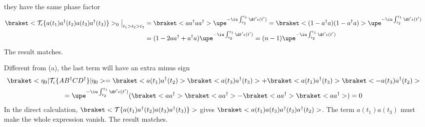 \begin{solution}
\begin{enumext}
    they have the same phase factor
    \begin{align*}
      \braket<
        \mathcal T_\epsilon\{a(t_1) a^\dagger(t_2) a(t_3) a^\dagger(t_3)\}>_0
      \big|_{t_1>t_2>t_3}
  & = \braket<a a^\dagger a a^\dagger>
      \upe^{-\iu\int_{t_2}^{t_1} \d t'\epsilon(t')}
    = \braket<(1 - a^\dagger a)(1 - a^\dagger a)>
      \upe^{-\iu\int_{t_2}^{t_1} \d t'\epsilon(t')}\\
  & = (1 - 2aa^\dagger + a^\dagger a)
      \upe^{-\iu\int_{t_2}^{t_1} \d t'\epsilon(t')}
    = (n - 1) \upe^{-\iu\int_{t_2}^{t_1} \d t'\epsilon(t')}
    \end{align*}
    The result matches.
    \item Different from (a), the last term will have an extra minus sign
    \begin{multline*}
      \braket<\eta_0|\mathcal T_\epsilon\{AB^\dagger CD^\dagger\}|\eta_0>
    = \braket<a(t_1) a^\dagger(t_2)>
      \braket<a(t_3) a^\dagger(t_3)>
    + \braket<a(t_1) a^\dagger(t_3)>
      \braket<-a(t_3) a^\dagger(t_2)>\\
    = \upe^{-\iu\int_{t_2}^{t_1} \d t'\epsilon(t')}(
      \braket<aa^\dagger> \braket<aa^\dagger>
    - \braket<aa^\dagger> \braket<aa^\dagger>) = 0
    \end{multline*}
    In the direct calculation,
    $\braket<\mathcal T\{a(t_1)a^\dagger(t_2)a(t_3)a^\dagger(t_3)\}>$
    gives $\braket<a(t_1)a(t_3)a^\dagger(t_3)a^\dagger(t_2)>$.
    The term $a(t_1)a(t_3)$ must make the whole expression vanish.
    The result matches.
  \end{enumext}
\end{solution}